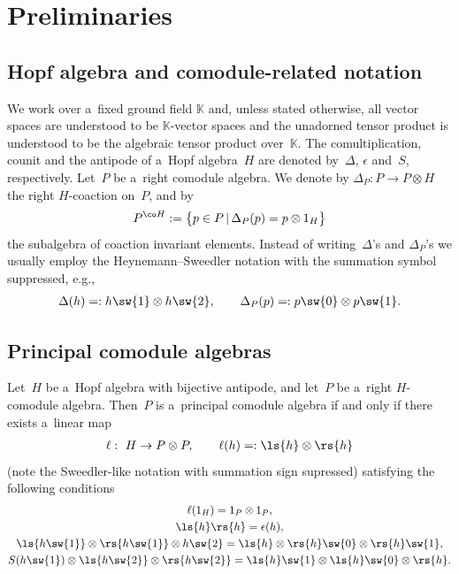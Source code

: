 \section{Preliminaries}\label{preliminaries}

\subsection{Hopf algebra and comodule-related notation}

We work over a~f\/ixed ground f\/ield $\mathbb{K}$ and, unless stated otherwise, all vector spaces are understood to be
$\mathbb{K}$-vector spaces and the unadorned tensor product is understood to be the algebraic tensor product over~$\mathbb{K}$.
The comultiplication, counit and the antipode of a~Hopf algebra~$H$ are denoted by~$\Delta$, ${\epsilon}$ and~$S$,
respectively.
Let~$P$ be a~right comodule algebra.
We denote by $\Delta_P:P\rightarrow P\otimes H$ the right $H$-coaction on~$P$, and by
\begin{gather*}
P^{\co H}:=\big\{p\in P
\,|\,
\Delta_P(p)=p\otimes 1_H\big\}
\end{gather*}
the subalgebra of coaction invariant elements.
Instead of writing~$\Delta$'s and $\Delta_P$'s we usually employ the Heynemann--Sweedler notation with the summation
symbol suppressed, e.g.,
\begin{gather*}
\Delta(h)=:h\sw{1}\otimes h\sw{2},
\qquad
\Delta_P(p)=:p\sw{0}\otimes p\sw{1}.
\end{gather*}

\subsection{Principal comodule algebras}

Let~$H$ be a~Hopf algebra with bijective antipode, and let~$P$ be a~right $H$-comodule algebra.
Then~$P$ is a~principal comodule algebra if and only if there exists a~linear map
\begin{gather*}
\ell: \ H\rightarrow P\otimes P,
\qquad
\ell(h)=:\ls{h}\otimes\rs{h}
\end{gather*}
(note the Sweedler-like notation with summation sign supressed) satisfying the following conditions
\begin{subequations}
\label{el-prop}
\begin{gather}
\ell(1_H)=1_P\otimes1_P,
\label{el-unitality}
\\
\ls{h}\rs{h}={\epsilon}(h),
\label{el-collapse}
\\
\ls{h\sw{1}}\otimes\rs{h\sw{1}}\otimes h\sw{2}=\ls{h}\otimes\rs{h}\sw{0}\otimes\rs{h}\sw{1},
\label{el-rcolinear}
\\
S(h\sw{1})\otimes\ls{h\sw{2}}\otimes\rs{h\sw{2}}=\ls{h}\sw{1}\otimes\ls{h}\sw{0}\otimes\rs{h}.
\label{el-lcolinear}
\end{gather}
\end{subequations}

